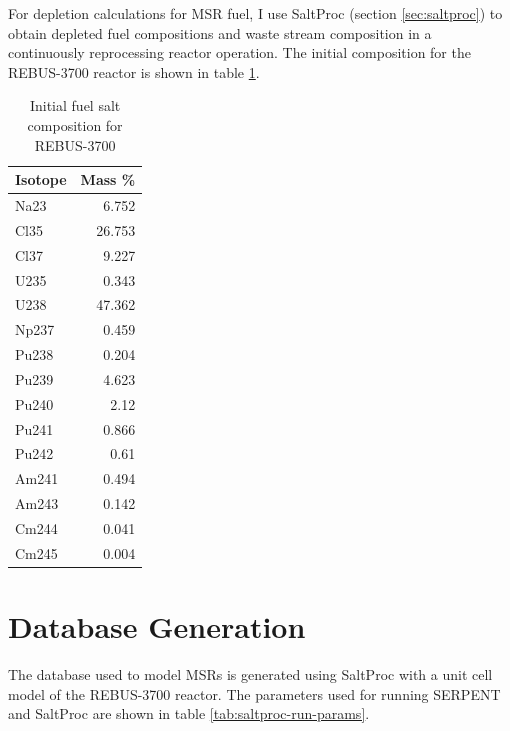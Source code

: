 For depletion calculations for \gls{MSR} fuel, I use SaltProc (section \ref{sec:saltproc})
to obtain depleted fuel compositions and waste stream composition in a continuously
reprocessing reactor operation. The initial composition for the REBUS-3700
reactor is shown in table \ref{tab:rebus_init}.


\begin{table}[h]
	\centering
	\caption{Initial fuel salt composition for REBUS-3700}
	\begin{tabular}{lr}
		\hline
		\textbf{Isotope} & \textbf{Mass \%}\\
		\hline
		Na23	&	6.752	\\
		Cl35	&	26.753	\\
		Cl37	&	9.227	\\
		U235	&	0.343	\\
		U238	&	47.362	\\
		Np237	&	0.459	\\
		Pu238	&	0.204	\\
		Pu239	&	4.623	\\
		Pu240	&	2.12	\\
		Pu241	&	0.866	\\
		Pu242	&	0.61	\\
		Am241	&	0.494	\\
		Am243	&	0.142	\\
		Cm244	&	0.041	\\
		Cm245	&	0.004	\\
		\hline
	\end{tabular}
	
	\label{tab:rebus_init}
	
\end{table}

\section{Database Generation}
The database used to model \glspl{MSR} is generated using SaltProc
with a unit cell model of the REBUS-3700 reactor. The parameters
used for running SERPENT and SaltProc are shown in table \ref{tab:saltproc-run-params}.

